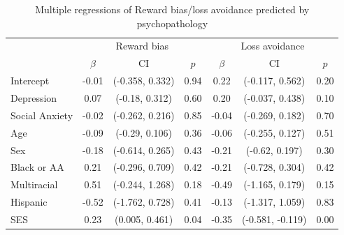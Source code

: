 \documentclass[english,man,floatsintext]{apa6}
\begin{document}
\begin{table}[tbp]
\begin{center}
\begin{threeparttable}
\end{threeparttable}
\end{center}

\end{table}

\begin{table}[tbp]

\begin{center}
\begin{threeparttable}

\caption{\label{tab:unnamed-chunk-6}Multiple regressions of Reward bias/loss avoidance predicted by psychopathology}

\begin{tabular}{lcccccc}
\toprule
 \multicolumn{1}{c}{ } & \multicolumn{3}{c}{Reward bias} & \multicolumn{3}{c}{Loss avoidance} \\
\cmidrule(r){1-1} \cmidrule(r){2-4} \cmidrule(r){5-7}
  & $\beta$ & CI & $p$ & $\beta$ & CI & $p$\\
\midrule
Intercept & -0.01 & (-0.358, 0.332) & 0.94 & 0.22 & (-0.117, 0.562) & 0.20\\
Depression & 0.07 & (-0.18, 0.312) & 0.60 & 0.20 & (-0.037, 0.438) & 0.10\\
Social Anxiety & -0.02 & (-0.262, 0.216) & 0.85 & -0.04 & (-0.269, 0.182) & 0.70\\
Age & -0.09 & (-0.29, 0.106) & 0.36 & -0.06 & (-0.255, 0.127) & 0.51\\
Sex & -0.18 & (-0.614, 0.265) & 0.43 & -0.21 & (-0.62, 0.197) & 0.30\\
Black or AA & 0.21 & (-0.296, 0.709) & 0.42 & -0.21 & (-0.728, 0.304) & 0.42\\
Multiracial & 0.51 & (-0.244, 1.268) & 0.18 & -0.49 & (-1.165, 0.179) & 0.15\\
Hispanic & -0.52 & (-1.762, 0.728) & 0.41 & -0.13 & (-1.317, 1.059) & 0.83\\
SES & 0.23 & (0.005, 0.461) & 0.04 & -0.35 & (-0.581, -0.119) & 0.00\\
\bottomrule
\end{tabular}

\end{threeparttable}
\end{center}

\end{table}
\end{document}
